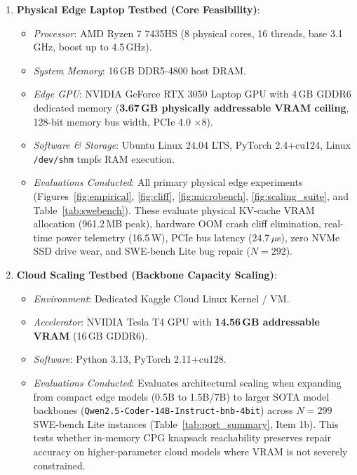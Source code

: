 \documentclass[journal]{IEEEtran}
\begin{document}
\begin{enumerate}
    \item \textbf{Physical Edge Laptop Testbed (Core Feasibility)}:
    \begin{itemize}
        \item \textit{Processor}: AMD Ryzen 7 7435HS (8 physical cores, 16 threads, base 3.1\,GHz, boost up to 4.5\,GHz).
        \item \textit{System Memory}: 16\,GB DDR5-4800 host DRAM.
        \item \textit{Edge GPU}: NVIDIA GeForce RTX 3050 Laptop GPU with 4\,GB GDDR6 dedicated memory (\textbf{3.67\,GB physically addressable VRAM ceiling}, 128-bit memory bus width, PCIe 4.0 $\times$8).
        \item \textit{Software \& Storage}: Ubuntu Linux 24.04 LTS, PyTorch 2.4+cu124, Linux \texttt{/dev/shm} tmpfs RAM execution.
        \item \textit{Evaluations Conducted}: All primary physical edge experiments (Figures~\ref{fig:empirical}, \ref{fig:cliff}, \ref{fig:microbench}, \ref{fig:scaling_suite}, and Table~\ref{tab:swebench}). These evaluate physical KV-cache VRAM allocation (961.2\,MB peak), hardware OOM crash cliff elimination, real-time power telemetry (16.5\,W), PCIe bus latency (24.7\,$\mu$s), zero NVMe SSD drive wear, and SWE-bench Lite bug repair ($N=292$).
    \end{itemize}

    \item \textbf{Cloud Scaling Testbed (Backbone Capacity Scaling)}:
    \begin{itemize}
        \item \textit{Environment}: Dedicated Kaggle Cloud Linux Kernel / VM.
        \item \textit{Accelerator}: NVIDIA Tesla T4 GPU with \textbf{14.56\,GB addressable VRAM} (16\,GB GDDR6).
        \item \textit{Software}: Python 3.13, PyTorch 2.11+cu128.
        \item \textit{Evaluations Conducted}: Evaluates architectural scaling when expanding from compact edge models (0.5B to 1.5B/7B) to larger SOTA model backbones (\texttt{Qwen2.5-Coder-14B-Instruct-bnb-4bit}) across $N=299$ SWE-bench Lite instances (Table~\ref{tab:port_summary}, Item 1b). This tests whether in-memory CPG knapsack reachability preserves repair accuracy on higher-parameter cloud models where VRAM is not severely constrained.
    \end{itemize}
\end{enumerate}
\end{document}
